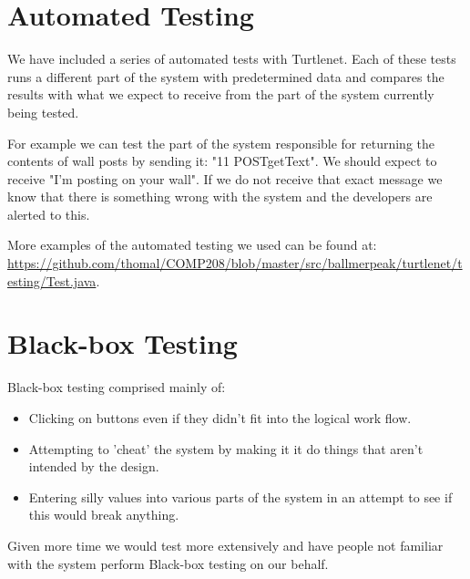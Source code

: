 \section{Automated Testing}
We have included a series of automated tests with Turtlenet. Each of these tests runs a different part of the system 
with predetermined data and compares the results with what we expect to receive from the part of the system currently 
being tested. \par

For example we can test the part of the system responsible for returning the contents of wall posts by sending it:
"11 POSTgetText". We should expect to receive "I'm posting on your wall". If we do not receive that exact message we
know that there is something wrong with the system and the developers are alerted to this. \par

More examples of the automated testing we used can be found at: \url{https://github.com/thomal/COMP208/blob/master/src/ballmerpeak/turtlenet/testing/Test.java}.

\section{Black-box Testing}
Black-box testing comprised mainly of:

\begin{itemize}
    \item Clicking on buttons even if they didn't fit into the logical work flow.
    \item Attempting to 'cheat' the system by making it it do things that aren't intended by the design.
    \item Entering silly values into various parts of the system in an attempt to see if this would break anything.
\end{itemize}

Given more time we would test more extensively and have people not familiar with the system perform Black-box testing on
our behalf.
